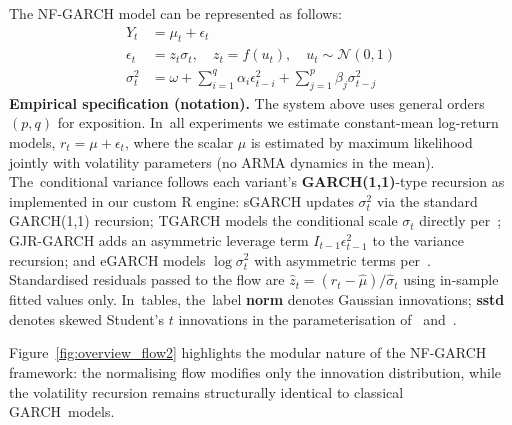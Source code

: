 \documentclass[risks,article,accept,pdftex,moreauthors]{Definitions/mdpi}
\begin{document}
The NF-GARCH model can be represented as follows:
\begin{align}
Y_t &= \mu_t + \epsilon_t \\
\epsilon_t &= z_t \sigma_t, \quad z_t = f(u_t), \quad u_t \sim \mathcal{N}(0,1) \\
\sigma_t^2 &= \omega + \sum_{i=1}^q \alpha_i \epsilon_{t-i}^2 + \sum_{j=1}^p \beta_j \sigma_{t-j}^2
\end{align}
\textbf{{Empirical} %
 specification (notation).} The system above uses general orders $(p,q)$ for exposition. In~all experiments we estimate constant-mean log-return models, $r_t = \mu + \epsilon_t$, where the scalar $\mu$ is estimated by maximum likelihood jointly with volatility parameters (no ARMA dynamics in the mean). The~conditional variance follows each variant's \textbf{GARCH(1,1)}-type recursion as implemented in our custom \textsf{R} engine: sGARCH updates $\sigma_t^2$ via the standard GARCH(1,1) recursion; TGARCH models the conditional scale $\sigma_t$ directly per~\cite{zakoian1994threshold}; GJR-GARCH adds an asymmetric leverage term $I_{t-1}\epsilon_{t-1}^2$ to the variance recursion; and eGARCH models $\log\sigma_t^2$ with asymmetric terms per~\cite{nelson1991conditional}. Standardised residuals passed to the flow are $\hat{z}_t = (r_t - \hat{\mu})/\hat{\sigma}_t$ using in-sample fitted values only. In~tables, the~label \textbf{norm} denotes Gaussian innovations; \textbf{sstd} denotes skewed Student's $t$ innovations in the parameterisation of~\cite{fernandez1998multivariate} and~\cite{hansen1994autoregressive}.

Figure~\ref{fig:overview_flow2} highlights the modular nature of the NF-GARCH framework: the normalising flow modifies only the innovation distribution, while the volatility recursion remains structurally identical to classical GARCH~models.
\end{document}
